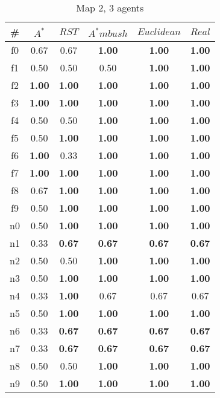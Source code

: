 \begin{table}[h]
\caption{Map 2, 3 agents}
\begin{center}

\begin{tabular}{|c|c|c|c|c|c|}
\hline
\# & $A^*$ & $RST$ & $A^*mbush$ & $Euclidean$ & $Real$\\
\hline
f0 & 0.67 & 0.67 & \textbf{1.00} & \textbf{1.00} & \textbf{1.00}\\
f1 & 0.50 & 0.50 & 0.50 & \textbf{1.00} & \textbf{1.00}\\
f2 & \textbf{1.00} & \textbf{1.00} & \textbf{1.00} & \textbf{1.00} & \textbf{1.00}\\
f3 & \textbf{1.00} & \textbf{1.00} & \textbf{1.00} & \textbf{1.00} & \textbf{1.00}\\
f4 & 0.50 & 0.50 & \textbf{1.00} & \textbf{1.00} & \textbf{1.00}\\
f5 & 0.50 & \textbf{1.00} & \textbf{1.00} & \textbf{1.00} & \textbf{1.00}\\
f6 & \textbf{1.00} & 0.33 & \textbf{1.00} & \textbf{1.00} & \textbf{1.00}\\
f7 & \textbf{1.00} & \textbf{1.00} & \textbf{1.00} & \textbf{1.00} & \textbf{1.00}\\
f8 & 0.67 & \textbf{1.00} & \textbf{1.00} & \textbf{1.00} & \textbf{1.00}\\
f9 & 0.50 & \textbf{1.00} & \textbf{1.00} & \textbf{1.00} & \textbf{1.00}\\
\hline
n0 & 0.50 & \textbf{1.00} & \textbf{1.00} & \textbf{1.00} & \textbf{1.00}\\
n1 & 0.33 & \textbf{0.67} & \textbf{0.67} & \textbf{0.67} & \textbf{0.67}\\
n2 & 0.50 & 0.50 & \textbf{1.00} & \textbf{1.00} & \textbf{1.00}\\
n3 & 0.50 & \textbf{1.00} & \textbf{1.00} & \textbf{1.00} & \textbf{1.00}\\
n4 & 0.33 & \textbf{1.00} & 0.67 & 0.67 & 0.67\\
n5 & 0.50 & \textbf{1.00} & \textbf{1.00} & \textbf{1.00} & \textbf{1.00}\\
n6 & 0.33 & \textbf{0.67} & \textbf{0.67} & \textbf{0.67} & \textbf{0.67}\\
n7 & 0.33 & \textbf{0.67} & \textbf{0.67} & \textbf{0.67} & \textbf{0.67}\\
n8 & 0.50 & 0.50 & \textbf{1.00} & \textbf{1.00} & \textbf{1.00}\\
n9 & 0.50 & \textbf{1.00} & \textbf{1.00} & \textbf{1.00} & \textbf{1.00}\\
\hline
\end{tabular}

\label{tab:exp2}
\end{center}
\end{table}


